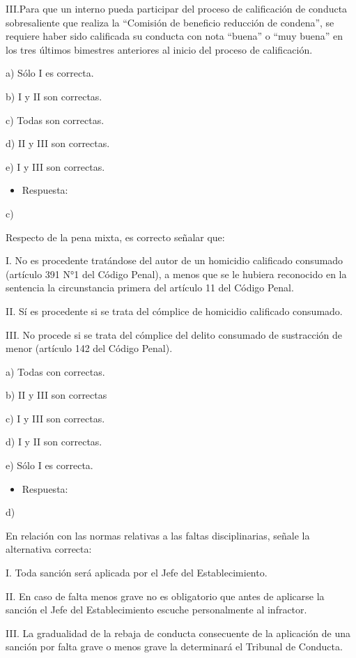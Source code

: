 \documentclass[letterpaper, 11pt]{article}
\begin{document}
III.Para que un interno pueda participar del proceso de calificación de conducta
sobresaliente que realiza la “Comisión de beneficio reducción de condena”, se
requiere haber sido calificada su conducta con nota “buena” o “muy buena” en los
tres últimos bimestres anteriores al inicio del proceso de calificación.

a) Sólo I es correcta.

b) I y II son correctas.

c) Todas son correctas.

d) II y III son correctas.

e) I y III son correctas.

\begin{itemize}
\item Respuesta:
\end{itemize}
c)


Respecto de la pena mixta, es correcto señalar que:

I. No es procedente tratándose del autor de un homicidio calificado consumado
(artículo 391 N°1 del Código Penal), a menos que se le hubiera reconocido en la
sentencia la circunstancia primera del artículo 11 del Código Penal.

II. Sí es procedente si se trata del cómplice de homicidio calificado consumado.

III. No procede si se trata del cómplice del delito consumado de sustracción de menor
(artículo 142 del Código Penal).

a) Todas con correctas.

b) II y III son correctas

c) I y III son correctas.

d) I y II son correctas.

e) Sólo I es correcta.

\begin{itemize}
\item Respuesta:
\end{itemize}
d)


En relación con las normas relativas a las faltas disciplinarias, señale la alternativa
correcta:

I. Toda sanción será aplicada por el Jefe del Establecimiento.

II. En caso de falta menos grave no es obligatorio que antes de aplicarse la sanción el
Jefe del Establecimiento escuche personalmente al infractor.

III. La gradualidad de la rebaja de conducta consecuente de la aplicación de una
sanción por falta grave o menos grave la determinará el Tribunal de Conducta.
\end{document}
